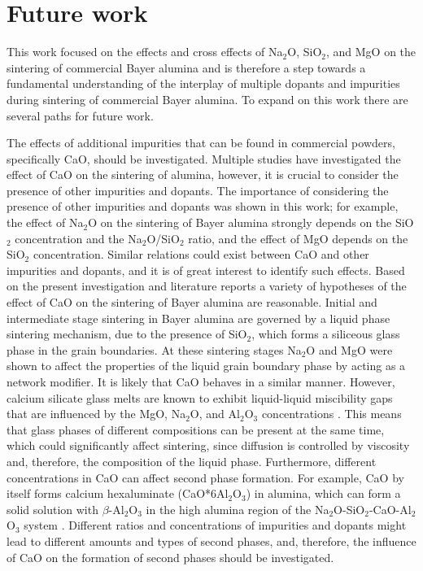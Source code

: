 \section{Future work}
This work focused on the effects and cross effects of Na$_{2}$O, SiO$_{2}$, and MgO on the sintering of commercial Bayer alumina and is therefore a step towards a fundamental understanding of the interplay of multiple dopants and impurities during sintering of commercial Bayer alumina. To expand on this work there are several paths for future work.

The effects of additional impurities that can be found in commercial powders, specifically CaO, should be investigated. Multiple studies have investigated the effect of CaO on the sintering of alumina, however, it is crucial to consider the presence of other impurities and dopants. The importance of considering the presence of other impurities and dopants was shown in this work; for example, the effect of Na$_{2}$O on the sintering of Bayer alumina strongly depends on the SiO$_{2}$ concentration and the Na$_{2}$O/SiO$_{2}$ ratio, and the effect of MgO depends on the SiO$_{2}$ concentration. Similar relations could exist between CaO and other impurities and dopants, and it is of great interest to identify such effects. Based on the present investigation and literature reports a variety of hypotheses of the effect of CaO on the sintering of Bayer alumina are reasonable. Initial and intermediate stage sintering in Bayer alumina are governed by a liquid phase sintering mechanism, due to the presence of SiO$_{2}$, which forms a siliceous glass phase in the grain boundaries. At these sintering stages Na$_{2}$O and MgO were shown to affect the properties of the liquid grain boundary phase by acting as a network modifier. It is likely that CaO behaves in a similar manner. However, calcium silicate glass melts are known to exhibit liquid-liquid miscibility gaps that are influenced by the MgO, Na$_{2}$O, and Al$_{2}$O$_{3}$ concentrations \cite{Kingery1983}. This means that glass phases of different compositions can be present at the same time, which could significantly affect sintering, since diffusion is controlled by viscosity and, therefore, the composition of the liquid phase. Furthermore, different concentrations in CaO can affect second phase formation. For example, CaO by itself forms calcium hexaluminate (CaO*6Al$_{2}$O$_{3}$) in alumina, which can form a solid solution with $\beta$-Al$_{2}$O$_{3}$ in the high alumina region of the Na$_{2}$O-SiO$_{2}$-CaO-Al$_{2}$O$_{3}$ system \cite{Vries1969}. Different ratios and concentrations of impurities and dopants might lead to different amounts and types of second phases, and, therefore, the influence of CaO on the formation of second phases should be investigated.

